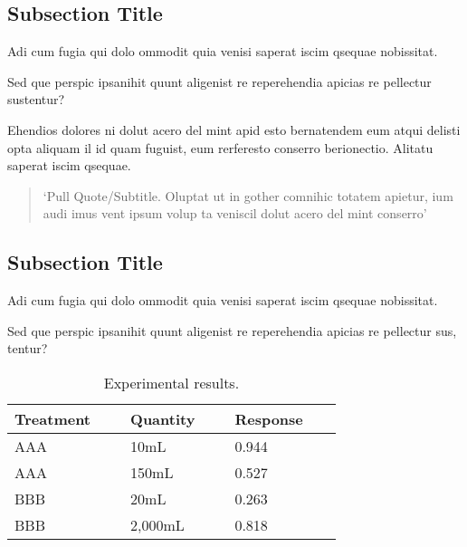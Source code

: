 \documentclass[
	landscape,       %
]{ImperialPoster}
\begin{document}
\begin{multicols}{4} %


	\subsection{Subsection Title}

	Adi cum fugia qui dolo ommodit quia venisi saperat iscim qsequae nobissitat.

	Sed que perspic ipsanihit quunt aligenist re reperehendia \textcolor{ICLBlue}{apicias re pellectur sustentur?}

	Ehendios \textcolor{ICLBlue}{dolores} ni dolut acero del mint apid esto bernatendem eum \textcolor{ICLBlue}{atqui delisti opta} aliquam il id quam fuguist, eum rerferesto conserro berionectio. Alitatu saperat iscim qsequae.

	\begin{quote}
		`Pull Quote/Subtitle. Oluptat ut in gother comnihic totatem apietur, ium audi imus vent ipsum volup ta veniscil dolut acero del mint conserro'
	\end{quote}

	\subsection{Subsection Title}

	Adi cum fugia qui dolo ommodit quia venisi saperat iscim qsequae nobissitat.

	Sed que perspic ipsanihit quunt aligenist re reperehendia apicias re pellectur sus, tentur?

	\begin{table}[H] %
		\caption{Experimental results.}
		\begin{tabular}{L{0.24\linewidth} C{0.24\linewidth} R{0.24\linewidth}}
			\toprule
			Treatment & Quantity & Response\\
			\midrule
			AAA & 10mL & 0.944\\
			AAA & 150mL & 0.527\\
			BBB & 20mL & 0.263\\
			BBB & 2,000mL & 0.818\\
			\bottomrule
		\end{tabular}
	\end{table}


\end{multicols}
\end{document}
